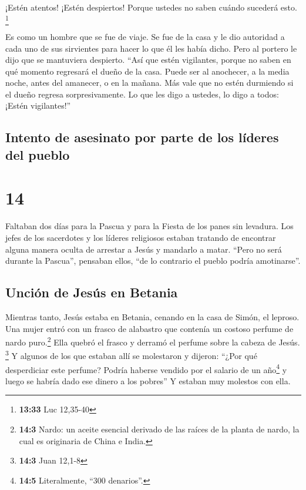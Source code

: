  ¡Estén atentos! ¡Estén despiertos! Porque ustedes no
saben cuándo sucederá esto. \footnote{\textbf{13:33} Luc 12,35-40}

 Es como un hombre que se fue de viaje. Se fue de la casa
y le dio autoridad a cada uno de sus sirvientes para hacer lo que él les
había dicho. Pero al portero le dijo que se mantuviera despierto.
 ``Así que estén vigilantes, porque no saben en qué
momento regresará el dueño de la casa. Puede ser al anochecer, a la
media noche, antes del amanecer, o en la mañana.  Más
vale que no estén durmiendo si el dueño regresa sorpresivamente.
 Lo que les digo a ustedes, lo digo a todos: ¡Estén
vigilantes!''

\hypertarget{intento-de-asesinato-por-parte-de-los-luxedderes-del-pueblo}{%
\subsection{Intento de asesinato por parte de los líderes del
pueblo}\label{intento-de-asesinato-por-parte-de-los-luxedderes-del-pueblo}}

\hypertarget{section-13}{%
\section{14}\label{section-13}}

 Faltaban dos días para la Pascua y para la Fiesta de los
panes sin levadura. Los jefes de los sacerdotes y los líderes religiosos
estaban tratando de encontrar alguna manera oculta de arrestar a Jesús y
mandarlo a matar.  ``Pero no será durante la Pascua'',
pensaban ellos, ``de lo contrario el pueblo podría amotinarse''.

\hypertarget{unciuxf3n-de-jesuxfas-en-betania}{%
\subsection{Unción de Jesús en
Betania}\label{unciuxf3n-de-jesuxfas-en-betania}}

 Mientras tanto, Jesús estaba en Betania, cenando en la
casa de Simón, el leproso. Una mujer entró con un frasco de alabastro
que contenía un costoso perfume de nardo puro.\footnote{\textbf{14:3}
  Nardo: un aceite esencial derivado de las raíces de la planta de
  nardo, la cual es originaria de China e India.} Ella quebró el frasco
y derramó el perfume sobre la cabeza de Jesús. \footnote{\textbf{14:3}
  Juan 12,1-8}  Y algunos de los que estaban allí se
molestaron y dijeron: ``¿Por qué desperdiciar este perfume?
 Podría haberse vendido por el salario de un
año\footnote{\textbf{14:5} Literalmente, ``300 denarios''.} y luego se
habría dado ese dinero a los pobres'' Y estaban muy molestos con ella.


